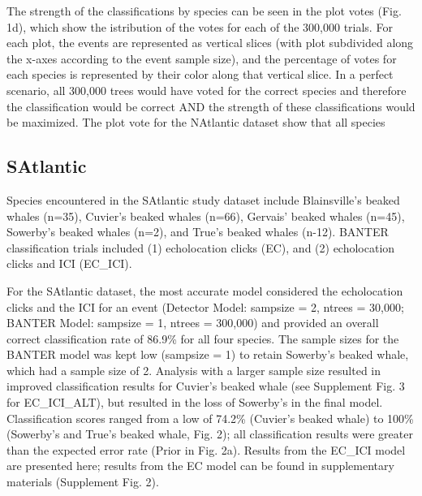 \documentclass[
  letterpaper,
  DIV=11,
  numbers=noendperiod]{scrartcl}
\begin{document}
The strength of the classifications by species can be seen in the plot
votes (Fig. 1d), which show the istribution of the votes for each of the
300,000 trials. For each plot, the events are represented as vertical
slices (with plot subdivided along the x-axes according to the event
sample size), and the percentage of votes for each species is
represented by their color along that vertical slice. In a perfect
scenario, all 300,000 trees would have voted for the correct species and
therefore the classification would be correct AND the strength of these
classifications would be maximized. The plot vote for the NAtlantic
dataset show that all species

\hypertarget{satlantic}{%
\subsection{SAtlantic}\label{satlantic}}

Species encountered in the SAtlantic study dataset include Blainsville's
beaked whales (n=35), Cuvier's beaked whales (n=66), Gervais' beaked
whales (n=45), Sowerby's beaked whales (n=2), and True's beaked whales
(n-12). BANTER classification trials included (1) echolocation clicks
(EC), and (2) echolocation clicks and ICI (EC\_ICI).

For the SAtlantic dataset, the most accurate model considered the
echolocation clicks and the ICI for an event (Detector Model: sampsize =
2, ntrees = 30,000; BANTER Model: sampsize = 1, ntrees = 300,000) and
provided an overall correct classification rate of 86.9\% for all four
species. The sample sizes for the BANTER model was kept low (sampsize =
1) to retain Sowerby's beaked whale, which had a sample size of 2.
Analysis with a larger sample size resulted in improved classification
results for Cuvier's beaked whale (see Supplement Fig. 3 for
EC\_ICI\_ALT), but resulted in the loss of Sowerby's in the final model.
Classification scores ranged from a low of 74.2\% (Cuvier's beaked
whale) to 100\% (Sowerby's and True's beaked whale, Fig. 2); all
classification results were greater than the expected error rate (Prior
in Fig. 2a). Results from the EC\_ICI model are presented here; results
from the EC model can be found in supplementary materials (Supplement
Fig. 2).
\end{document}
